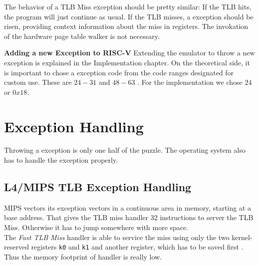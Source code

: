 The behavior of a TLB Miss exception should be pretty similar: If the TLB hits, the program will
just continue as usual. If the TLB misses, a exception should be risen, providing context
information about the miss in registers. The invokation of the hardware page table walker is
not necessary.


\textbf{Adding a new Exception to RISC-V}
Extending the emulator to throw a new exception is explained in the Implementation chapter.
On the theoretical side, it is important to chose a exception code from the code ranges designated
for custom use. These are $24-31$ and $48-63$ \cite{RISCVInstructionSet}. For the implementation we chose $24$ or $0x18$.




\section{Exception Handling}
Throwing a exception is only one half of the puzzle. The operating system also has to handle the exception
properly.
\subsection{L4/MIPS TLB Exception Handling}
MIPS vectors its exception vectors in a continuous area in memory, starting at a base address.
That gives the TLB miss handler 32 instructions to server the TLB Miss. Otherwise it has to jump
somewhere with more space.\\
The \emph{Fast TLB Miss} handler is able to service the miss using only the two kernel-reserved
registers \texttt{k0} and \texttt{k1} and another register, which has to be saved first \cite{heiserAnatomyHighPerformanceMicrokernel}.\\
Thus the memory footprint of handler is really low.

